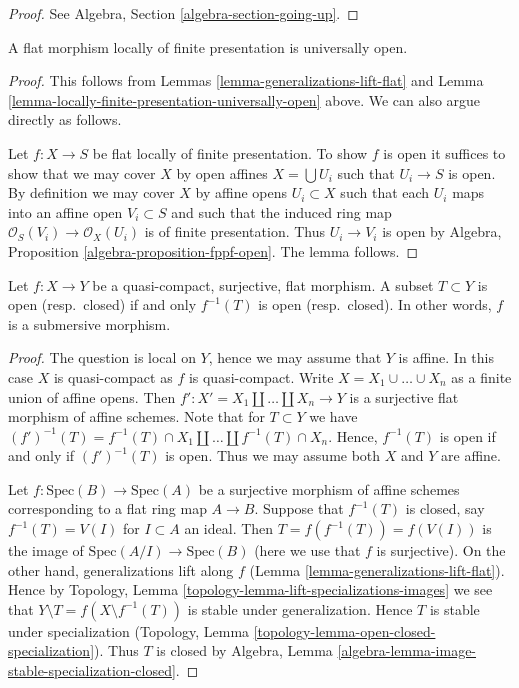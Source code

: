 \begin{proof}
See Algebra, Section \ref{algebra-section-going-up}.
\end{proof}

\begin{lemma}
\label{lemma-fppf-open}
A flat morphism locally of finite presentation is universally open.
\end{lemma}

\begin{proof}
This follows from Lemmas \ref{lemma-generalizations-lift-flat} and
Lemma \ref{lemma-locally-finite-presentation-universally-open} above.
We can also argue directly as follows.

\medskip\noindent
Let $f : X \to S$ be flat locally of finite presentation.
To show $f$ is open it suffices to show that we may cover
$X$ by open affines $X = \bigcup U_i$ such that $U_i \to S$
is open. By definition we may cover $X$ by
affine opens $U_i \subset X$ such that each $U_i$ maps
into an affine open $V_i \subset S$ and such that
the induced ring map $\mathcal{O}_S(V_i) \to \mathcal{O}_X(U_i)$ is
of finite presentation. Thus $U_i \to V_i$ is open by
Algebra, Proposition \ref{algebra-proposition-fppf-open}.
The lemma follows.
\end{proof}

\begin{lemma}
\label{lemma-fpqc-quotient-topology}
Let $f : X \to Y$ be a quasi-compact, surjective, flat morphism.
A subset $T \subset Y$ is open (resp.\ closed) if and only
$f^{-1}(T)$ is open (resp.\ closed). In other words, $f$ is
a submersive morphism.
\end{lemma}

\begin{proof}
The question is local on $Y$, hence we may assume that $Y$ is affine.
In this case $X$ is quasi-compact as $f$ is quasi-compact.
Write $X = X_1 \cup \ldots \cup X_n$ as a finite union of affine opens.
Then $f' : X' = X_1 \coprod \ldots \coprod X_n \to Y$ is a surjective
flat morphism of affine schemes. Note that for $T \subset Y$ we have
$(f')^{-1}(T) = f^{-1}(T) \cap X_1 \coprod \ldots \coprod f^{-1}(T) \cap X_n$.
Hence, $f^{-1}(T)$ is open if and only if $(f')^{-1}(T)$ is open.
Thus we may assume both $X$ and $Y$ are affine.

\medskip\noindent
Let $f : \text{Spec}(B) \to \text{Spec}(A)$ be a surjective
morphism of affine schemes corresponding to a flat ring map $A \to B$.
Suppose that $f^{-1}(T)$ is closed, say $f^{-1}(T) = V(I)$ for $I \subset A$
an ideal. Then $T = f(f^{-1}(T)) = f(V(I))$ is the image of
$\text{Spec}(A/I) \to \text{Spec}(B)$ (here we use that $f$
is surjective). On the other hand, generalizations lift along $f$
(Lemma \ref{lemma-generalizations-lift-flat}).
Hence by Topology, Lemma \ref{topology-lemma-lift-specializations-images}
we see that $Y \setminus T = f(X \setminus f^{-1}(T))$ is stable under
generalization. Hence $T$ is stable under specialization
(Topology, Lemma \ref{topology-lemma-open-closed-specialization}).
Thus $T$ is closed by
Algebra, Lemma \ref{algebra-lemma-image-stable-specialization-closed}.
\end{proof}

